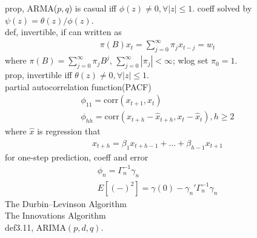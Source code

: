 \documentclass[paper=a4, fontsize=11pt]{scrartcl} %
\numberwithin{equation}{section} %
\numberwithin{figure}{section} %
\numberwithin{table}{section} %
\begin{document}
prop, ARMA($p,q$) is casual iff $\phi(z)\neq 0,\forall|z|\leq 1$. coeff solved by $\psi(z) = \theta(z)/\phi(z)$.\\
def, invertible, if can written as
\begin{align}
	\pi(B)x_t = \sum_{j=0}^\infty \pi_j x_{t-j} = w_t
\end{align}
where $\pi(B)=\sum_{j=0}^\infty\pi_jB^j$, $\sum_{j=0}^\infty |\pi_j|<\infty$; wlog set $\pi_0=1$.\\
prop, invertible iff $\theta(z)\neq 0,\forall |z|\leq 1$.\\
partial autocorrelation function(PACF)
\begin{align}
	\phi_{11}=\text{corr}(x_{t+1}, x_t)\\
	\phi_{hh}=\text{corr}(x_{t+h}-\widehat{x}_{t+h}, x_t - \widehat{x}_t), h\geq 2
\end{align}
where $\widehat{x}$ is regression that
\begin{align}
	\widehat{x}_{t+h} = \beta_1 x_{t+h-1}+\dots +\beta_{h-1}x_{t+1}
\end{align}
for one-step prediction, coeff and error
\begin{align}
	\phi_n = \Gamma_n^{-1}\gamma_n\\
	E[(-)^2] = \gamma(0) - \gamma_n'\Gamma_n^{-1}\gamma_n
\end{align}
The Durbin–Levinson Algorithm\\
The Innovations Algorithm\\
def3.11, ARIMA$(p,d,q)$.
\end{document}
